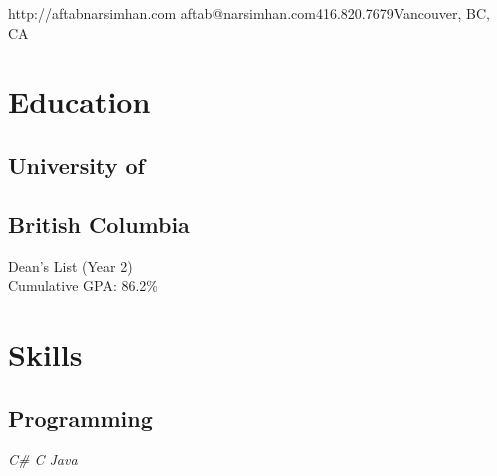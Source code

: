 \documentclass[]{aftab-resume}
\begin{document}
       {http://aftabnarsimhan.com}
       {aftab@narsimhan.com}{416.820.7679}{Vancouver, BC, CA}
       

%
%

\begin{minipage}[t]{0.33\textwidth} 


\section{Education}
\vspace{0.15cm}

\subsection{University of}
\subsection{British Columbia}
\vspace{0.05cm}
\vspace{0.05cm}
\vspace{0.05cm}
\textbullet{} Dean's List (Year 2) \\
\textbullet{} Cumulative GPA: 86.2\%
\vspace{0.075cm}

\vspace{0.75cm}


\section{Skills}
\vspace{0.15cm}

\subsection{Programming}
\vspace{0.01cm}

\it{\textbullet{} C\# \textbullet{} C \textbullet{} Java \\ }
\vspace{0.05cm}


\end{minipage}
\end{document}
